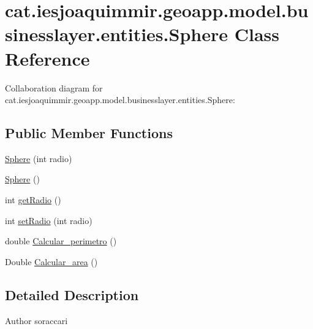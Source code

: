 \hypertarget{classcat_1_1iesjoaquimmir_1_1geoapp_1_1model_1_1businesslayer_1_1entities_1_1_sphere}{}\section{cat.\+iesjoaquimmir.\+geoapp.\+model.\+businesslayer.\+entities.\+Sphere Class Reference}
\label{classcat_1_1iesjoaquimmir_1_1geoapp_1_1model_1_1businesslayer_1_1entities_1_1_sphere}


Collaboration diagram for cat.\+iesjoaquimmir.\+geoapp.\+model.\+businesslayer.\+entities.\+Sphere\+:
\subsection*{Public Member Functions}
\begin{DoxyCompactItemize}
\item 
\mbox{\hyperlink{classcat_1_1iesjoaquimmir_1_1geoapp_1_1model_1_1businesslayer_1_1entities_1_1_sphere_ae612a2932ae873734a0b95e82bd5e990}{Sphere}} (int radio)
\item 
\mbox{\hyperlink{classcat_1_1iesjoaquimmir_1_1geoapp_1_1model_1_1businesslayer_1_1entities_1_1_sphere_ad2a4ac788675a83da4d3359af0f03bd0}{Sphere}} ()
\item 
int \mbox{\hyperlink{classcat_1_1iesjoaquimmir_1_1geoapp_1_1model_1_1businesslayer_1_1entities_1_1_sphere_aea5748f7b190972273427017b49bbd22}{get\+Radio}} ()
\item 
int \mbox{\hyperlink{classcat_1_1iesjoaquimmir_1_1geoapp_1_1model_1_1businesslayer_1_1entities_1_1_sphere_a500df1061ee57a3050841a4f21f5cdb5}{set\+Radio}} (int radio)
\item 
double \mbox{\hyperlink{classcat_1_1iesjoaquimmir_1_1geoapp_1_1model_1_1businesslayer_1_1entities_1_1_sphere_a6f4f07ad1d3d3e2680e65020c08682b7}{Calcular\+\_\+perimetro}} ()
\item 
Double \mbox{\hyperlink{classcat_1_1iesjoaquimmir_1_1geoapp_1_1model_1_1businesslayer_1_1entities_1_1_sphere_a0b8576de29046eb6d5d5a67f9534adcf}{Calcular\+\_\+area}} ()
\end{DoxyCompactItemize}


\subsection{Detailed Description}
\begin{DoxyAuthor}{Author}
soraccari 
\end{DoxyAuthor}


